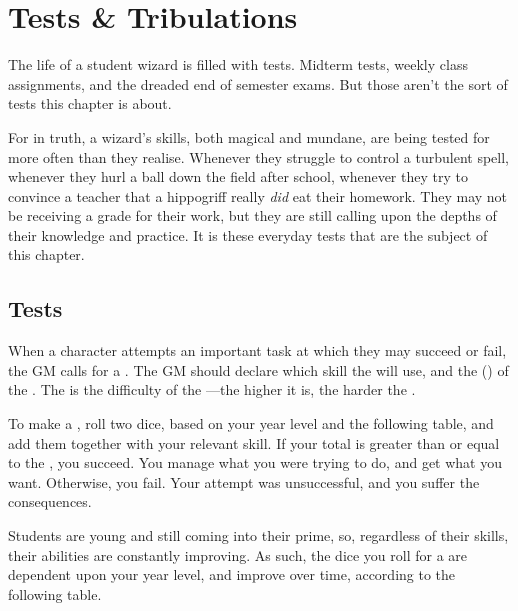 \chapter{Tests \& Tribulations}


The life of a student wizard is filled with tests.
Midterm tests, weekly class assignments, and the dreaded end of semester exams.
But those aren't the sort of tests this chapter is about.

For in truth, a wizard's skills, both magical and mundane, are being tested for more often than they realise.
Whenever they struggle to control a turbulent spell,
whenever they hurl a ball down the field after school,
whenever they try to convince a teacher that a hippogriff really \emph{did} eat their homework.
They may not be receiving a grade for their work, but they are still calling upon the depths of their knowledge and practice.
It is these everyday tests that are the subject of this chapter.

\section{Tests}

When a character attempts an important task at which they may succeed or fail, the GM calls for a {\test}.
The GM should declare which skill the {\test} will use, and the {\targetnumber} ({\tn}) of the {\test}.
The {\targetnumber} is the difficulty of the {\test}---the higher it is, the harder the {\test}.

To make a {\test}, roll two dice, based on your year level and the following table, and add them together with your relevant skill.
If your total is greater than or equal to the {\tn}, you succeed.
You manage what you were trying to do, and get what you want.
Otherwise, you fail.
Your attempt was unsuccessful, and you suffer the consequences.

Students are young and still coming into their prime, so, regardless of their skills, their abilities are constantly improving.
As such, the dice you roll for a {\test} are dependent upon your year level, and improve over time, according to the following table.


